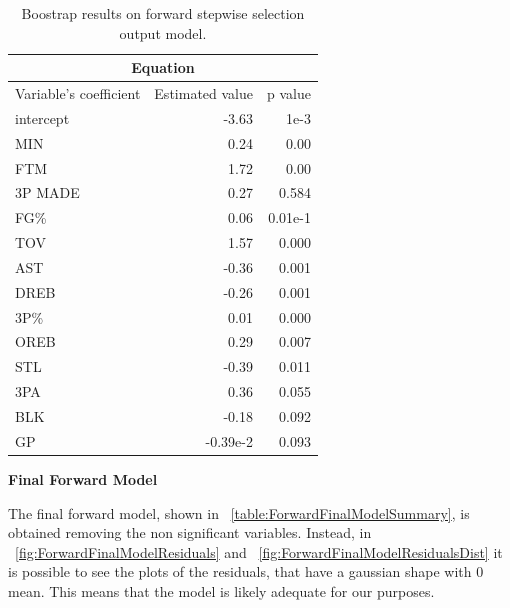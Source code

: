 \begin{table}[H]
	\centering
	\begin{tabular}{|| l | r | r ||} 
		\hline
		\multicolumn{3}{|c|}{Equation} \\
		\hline
		Variable's coefficient & Estimated value & p value \\
		\hline
		intercept & -3.63 & 1e-3 \\
		MIN & 0.24 & 0.00 \\
		FTM & 1.72 & 0.00 \\
		3P MADE & 0.27 & 0.584 \\
		FG\% & 0.06 & 0.01e-1 \\
		TOV & 1.57 & 0.000 \\
		AST & -0.36 & 0.001 \\
		DREB & -0.26 & 0.001 \\
		3P\% & 0.01 & 0.000 \\
		OREB & 0.29 & 0.007 \\
		STL & -0.39 & 0.011 \\
		3PA & 0.36 & 0.055 \\
		BLK & -0.18 & 0.092 \\
		GP & -0.39e-2 & 0.093 \\
		\hline
	\end{tabular}
	\caption{Boostrap results on forward stepwise selection output model.}
	\label{table:BootForwardModel}
\end{table}

\vspace{0.2cm}
\noindent
\textbf{Final Forward Model}

The final forward model, shown in \Tab~\ref{table:ForwardFinalModelSummary}, is obtained removing the non significant variables. Instead, in \Fig~\ref{fig:ForwardFinalModelResiduals} and \Fig~\ref{fig:ForwardFinalModelResidualsDist} it is possible to see the plots of the residuals, that have a gaussian shape with 0 mean. This means that the model is likely adequate for our purposes.

